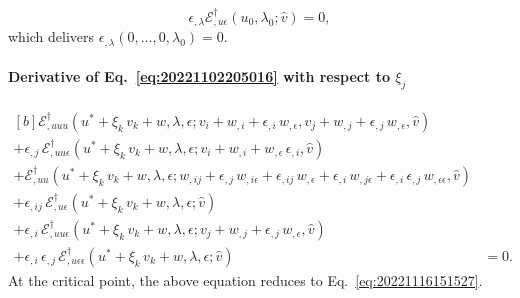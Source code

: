 \documentclass[12pt, final]{scrartcl}
\theoremstyle{definition}
\newcommand{\E}{\mathcal E}
\newcommand{\EE}{\mathcal E ^ \dagger}
\begin{document}
\begin{equation}
  \epsilon_{,\lambda} \EE_{,u\epsilon}(u_0, \lambda_0; \hat{v}) = 0,
\end{equation}
which delivers \(\epsilon_{,\lambda}(0, \ldots, 0, \lambda_0) = 0\).

\paragraph{Derivative of Eq.~\eqref{eq:20221102205016} with respect to \(\xi_j\)}
\begin{equation}
  \label{eq:20221109062643}
  \begin{aligned}[b]
    \EE_{,uuu}(u^\ast + \xi_k \, v_k + w, \lambda, \epsilon; v_i + w_{,i} + \epsilon_{,i} \,  w_{,\epsilon}, v_j + w_{,j} + \epsilon_{,j} \, w_{,\epsilon}, \hat{v})&\\
    + \epsilon_{,j} \, \EE_{,uu\epsilon}(u^\ast + \xi_k \, v_k + w, \lambda, \epsilon; v_i + w_{,i} + w_{,\epsilon} \, \epsilon_{,i}, \hat{v})&\\
    + \EE_{,uu}(u^\ast + \xi_k \, v_k + w, \lambda, \epsilon; w_{,ij} + \epsilon_{,j} \, w_{,i\epsilon} + \epsilon_{,ij} \, w_{,\epsilon} + \epsilon_{,i} \, w_{,j\epsilon} + \epsilon_{,i} \, \epsilon_{,j} \, w_{,\epsilon\epsilon} , \hat{v})&\\
    + \epsilon_{,ij} \, \EE_{,u\epsilon}(u^\ast + \xi_k \, v_k + w, \lambda, \epsilon; \hat{v})&\\
    + \epsilon_{,i} \, \EE_{,uu\epsilon}(u^\ast + \xi_k \, v_k + w, \lambda, \epsilon; v_j + w_{,j} + \epsilon_{,j} \, w_{,\epsilon}, \hat{v})&\\
    + \epsilon_{,i} \, \epsilon_{,j} \, \EE_{,u\epsilon\epsilon}(u^\ast + \xi_k \, v_k + w, \lambda, \epsilon; \hat{v}) &= 0.
  \end{aligned}
\end{equation}
At the critical point, the above equation reduces to Eq.~\eqref{eq:20221116151527}.
\end{document}
